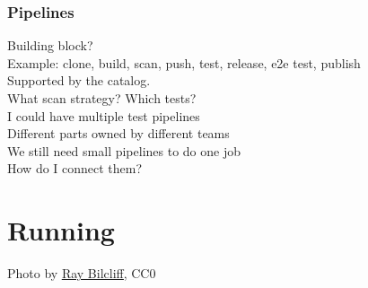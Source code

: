 \documentclass[aspectratio=169,11pt,hyperref={colorlinks=true}]{beamer}
\begin{document}
\begin{grayframe}
\begin{textblock*}{0.3\paperwidth}
  \end{textblock*}
\end{grayframe}

\begin{grayframe}
  \frametitle{Pipelines}
  Building block? \\
  Example: clone, build, scan, push, test, release, e2e test, publish \\
  Supported by the catalog. \\
  What scan strategy? Which tests? \\
  I could have multiple test pipelines \\
  Different parts owned by different teams \\
  We still need small pipelines to do one job \\
  How do I connect them?
\end{grayframe}

\section[Running]{Running}

\begin{sectionwithpic}{Photo by \href{https://www.pexels.com/@raybilcliff}{\underline{Ray Bilcliff}}, CC0}
\end{sectionwithpic}
\end{document}
